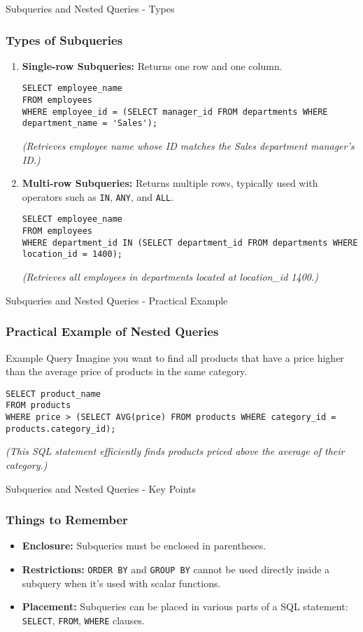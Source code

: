 \documentclass[aspectratio=169]{beamer}
\begin{document}
\begin{frame}[fragile]{Subqueries and Nested Queries - Types}
    \frametitle{Types of Subqueries}
    \begin{enumerate}
        \item \textbf{Single-row Subqueries:} Returns one row and one column.
        \begin{lstlisting}
SELECT employee_name 
FROM employees 
WHERE employee_id = (SELECT manager_id FROM departments WHERE department_name = 'Sales');
        \end{lstlisting}
        \hfill \textit{(Retrieves employee name whose ID matches the Sales department manager's ID.)}
        
        \item \textbf{Multi-row Subqueries:} Returns multiple rows, typically used with operators such as \texttt{IN}, \texttt{ANY}, and \texttt{ALL}.
        \begin{lstlisting}
SELECT employee_name 
FROM employees 
WHERE department_id IN (SELECT department_id FROM departments WHERE location_id = 1400);
        \end{lstlisting}
        \hfill \textit{(Retrieves all employees in departments located at location\_id 1400.)}
    \end{enumerate}
\end{frame}

\begin{frame}[fragile]{Subqueries and Nested Queries - Practical Example}
    \frametitle{Practical Example of Nested Queries}
    \begin{block}{Example Query}
        Imagine you want to find all products that have a price higher than the average price of products in the same category.
        \begin{lstlisting}
SELECT product_name 
FROM products 
WHERE price > (SELECT AVG(price) FROM products WHERE category_id = products.category_id);
        \end{lstlisting}
    \end{block}
    \hfill \textit{(This SQL statement efficiently finds products priced above the average of their category.)}
\end{frame}

\begin{frame}[fragile]{Subqueries and Nested Queries - Key Points}
    \frametitle{Things to Remember}
    \begin{itemize}
        \item \textbf{Enclosure:} Subqueries must be enclosed in parentheses.
        \item \textbf{Restrictions:} \texttt{ORDER BY} and \texttt{GROUP BY} cannot be used directly inside a subquery when it’s used with scalar functions.
        \item \textbf{Placement:} Subqueries can be placed in various parts of a SQL statement: \texttt{SELECT}, \texttt{FROM}, \texttt{WHERE} clauses.
    \end{itemize}
\end{frame}
\end{document}
